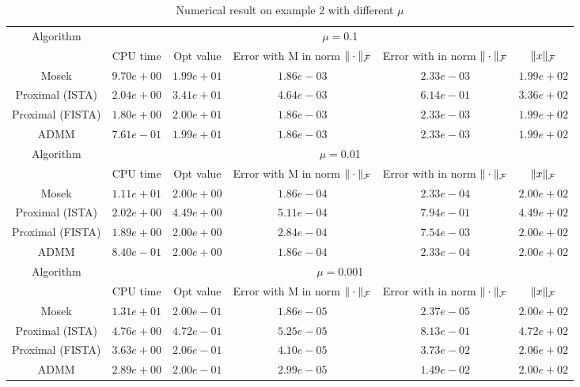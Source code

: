 \documentclass{article}
\begin{document}
   \begin{table}
	\centering
	\begin{tabular}{|c|c|c|c|c|c|}
	
	\hline
	\multirow{2}{*}{ Algorithm} &\multicolumn{5}{c|}{$\mu=$0.1}\\\cline{2-6}
	 &CPU time &Opt value &Error with M in norm $\|\cdot\|_\mathcal F$ &Error with in norm $\|\cdot\|_\mathcal F$ &$\|x\|_\mathcal F$\\\hline
	Mosek & $9.70e+00$ & $1.99e+01$ & $1.86e-03$ & $2.33e-03$ & $1.99e+02$\\\hline
	Proximal (ISTA) & $2.04e+00$ & $3.41e+01$ & $4.64e-03$ & $6.14e-01$ & $3.36e+02$\\\hline
	Proximal (FISTA) & $1.80e+00$ & $2.00e+01$ & $1.86e-03$ & $2.33e-03$ & $1.99e+02$\\\hline
	ADMM & $7.61e-01$ & $1.99e+01$ & $1.86e-03$ & $2.33e-03$ & $1.99e+02$\\\hline
\multirow{2}{*}{ Algorithm} &\multicolumn{5}{c|}{$\mu=$0.01}\\\cline{2-6}
 &CPU time &Opt value &Error with M in norm $\|\cdot\|_\mathcal F$ &Error with in norm $\|\cdot\|_\mathcal F$ &$\|x\|_\mathcal F$\\\hline
Mosek & $1.11e+01$ & $2.00e+00$ & $1.86e-04$ & $2.33e-04$ & $2.00e+02$\\\hline
Proximal (ISTA) & $2.02e+00$ & $4.49e+00$ & $5.11e-04$ & $7.94e-01$ & $4.49e+02$\\\hline
Proximal (FISTA) & $1.89e+00$ & $2.00e+00$ & $2.84e-04$ & $7.54e-03$ & $2.00e+02$\\\hline
ADMM & $8.40e-01$ & $2.00e+00$ & $1.86e-04$ & $2.33e-04$ & $2.00e+02$\\\hline
\multirow{2}{*}{ Algorithm} &\multicolumn{5}{c|}{$\mu=$0.001}\\\cline{2-6}
 &CPU time &Opt value &Error with M in norm $\|\cdot\|_\mathcal F$ &Error with in norm $\|\cdot\|_\mathcal F$ &$\|x\|_\mathcal F$\\\hline
Mosek & $1.31e+01$ & $2.00e-01$ & $1.86e-05$ & $2.37e-05$ & $2.00e+02$\\\hline
Proximal (ISTA) & $4.76e+00$ & $4.72e-01$ & $5.25e-05$ & $8.13e-01$ & $4.72e+02$\\\hline
Proximal (FISTA) & $3.63e+00$ & $2.06e-01$ & $4.10e-05$ & $3.73e-02$ & $2.06e+02$\\\hline
ADMM & $2.89e+00$ & $2.00e-01$ & $2.99e-05$ & $1.49e-02$ & $2.00e+02$\\\hline
	\end{tabular}
	\caption{Numerical result on example 2 with different $\mu$\label{example2}}
	\end{table}
	
\end{document}
